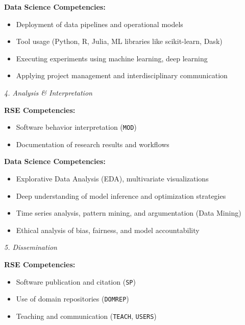 \documentclass[
        english,biblatex
    ]{lni}
\providecommand{\tightlist}{%
    \setlength{\itemsep}{0pt}\setlength{\parskip}{0pt}}
\begin{document}
    \textbf{Data Science Competencies:}

    \begin{itemize}
    \tightlist
    \item
      Deployment of data pipelines and operational models
    \item
      Tool usage (Python, R, Julia, ML libraries like scikit-learn,
      Dask)
    \item
      Executing experiments using machine learning, deep learning
    \item
      Applying project management and interdisciplinary communication
    \end{itemize}

    \emph{4. Analysis \& Interpretation}

    \textbf{RSE Competencies:}

    \begin{itemize}
    \tightlist
    \item
      Software behavior interpretation (\texttt{MOD})
    \item
      Documentation of research results and workflows
    \end{itemize}

    \textbf{Data Science Competencies:}

    \begin{itemize}
    \tightlist
    \item
      Explorative Data Analysis (EDA), multivariate visualizations
    \item
      Deep understanding of model inference and optimization strategies
    \item
      Time series analysis, pattern mining, and argumentation (Data
      Mining)
    \item
      Ethical analysis of bias, fairness, and model accountability
    \end{itemize}

    \emph{5. Dissemination}

    \textbf{RSE Competencies:}

    \begin{itemize}
    \tightlist
    \item
      Software publication and citation (\texttt{SP})
    \item
      Use of domain repositories (\texttt{DOMREP})
    \item
      Teaching and communication (\texttt{TEACH}, \texttt{USERS})
    \end{itemize}
\end{document}
